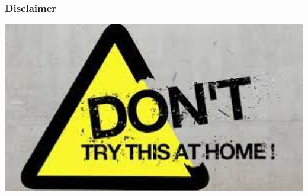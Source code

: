 \documentclass{beamer}
\begin{document}
{\begin{frame}[allowframebreaks]
\end{frame}

\begin{frame}
   \frametitle{Disclaimer}

      \begin{center}
          \includegraphics[width=1\textwidth] {./pics_2022_03/index.jpeg}	
      \end{center} 

\end{frame}

}
\end{document}
